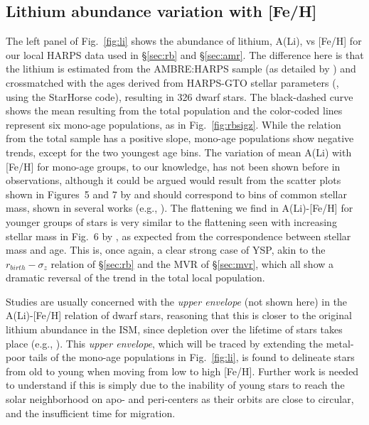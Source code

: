 \documentclass[usenatbib]{mnras}
\begin{document}
\subsection{Lithium abundance variation with [Fe/H] }
\label{sec:li}

The left panel of Fig.~\ref{fig:li} shows the abundance of lithium, A(Li), vs [Fe/H] for our local HARPS data used in \S\ref{sec:rb} and \S\ref{sec:amr}. The difference here is that the lithium is estimated from the AMBRE:HARPS sample (as detailed by \citealt{guiglion16b,guiglion16}) and crossmatched with the ages derived from HARPS-GTO stellar parameters (\citealt{anders18}, using the StarHorse code), resulting in 326 dwarf stars. The black-dashed curve shows the mean resulting from the total population and the color-coded lines represent six mono-age populations, as in Fig.~\ref{fig:rbsigz}. While the relation from the total sample has a positive slope, mono-age populations show negative trends, except for the two youngest age bins. The variation of mean A(Li) with [Fe/H] for mono-age groups, to our knowledge, has not been shown before in observations, although it could be argued would result from the scatter plots shown in Figures~5 and 7 by \cite{ramirez12} and should correspond to bins of common stellar mass, shown in several works (e.g., \citealt{nissen12, ramirez12, delgadomena15, bensby18}). The flattening we find in A(Li)-[Fe/H] for younger groups of stars is very similar to the flattening seen with increasing stellar mass in Fig.~6 by \cite{bensby18}, as expected from the correspondence between stellar mass and age. This is, once again, a clear strong case of YSP, akin to the $r_{birth}-\sigma_z$ relation of \S\ref{sec:rb} and the MVR of \S\ref{sec:mvr}, which all show a dramatic reversal of the trend in the total local population.

Studies are usually concerned with the {\it upper envelope} (not shown here) in the A(Li)-[Fe/H] relation of dwarf stars, reasoning that this is closer to the original lithium abundance in the ISM, since depletion over the lifetime of stars takes place (e.g., \citealt{rebolo88, romano99, lambert04, guiglion16, cescutti19, guiglion19}). This {\it upper envelope}, which will be traced by extending the metal-poor tails of the mono-age populations in Fig.~\ref{fig:li}, is found to delineate stars from old to young when moving from low to high [Fe/H]. Further work is needed to understand if this is simply due to the inability of young stars to reach the solar neighborhood on apo- and peri-centers as their orbits are close to circular, and the insufficient time for migration.
\end{document}
